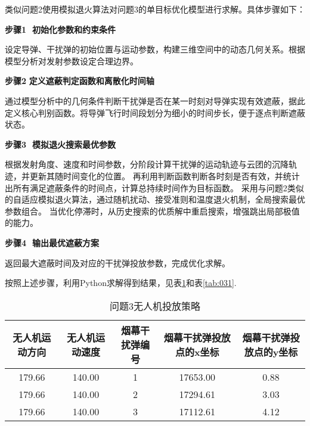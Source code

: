 \documentclass[../main.tex]{subfiles}
\begin{document}

类似问题2使用模拟退火算法对问题3的单目标优化模型进行求解。具体步骤如下：

\noindent\textbf{步骤1 $\,\,$初始化参数和约束条件} 

设定导弹、干扰弹的初始位置与运动参数，构建三维空间中的动态几何关系。根据模型分析对发射参数设定合理边界。

\noindent\textbf{步骤2$\,\,$定义遮蔽判定函数和离散化时间轴}

通过模型分析中的几何条件判断干扰弹是否在某一时刻对导弹实现有效遮蔽，据此定义核心判别函数。将导弹飞行时间段划分为细小的时间步长，便于逐点判断遮蔽状态。

\noindent\textbf{步骤3 $\,\,$模拟退火搜索最优参数} 

根据发射角度、速度和时间参数，分阶段计算干扰弹的运动轨迹与云团的沉降轨迹，并更新其随时间变化的位置。
再利用判断函数判断各时刻是否有效，并统计出所有满足遮蔽条件的时间点，计算总持续时间作为目标函数。
采用与问题2类似的自适应模拟退火算法，通过随机扰动、接受准则和温度退火机制，全局搜索最优参数组合。
当优化停滞时，从历史搜索的优质解中重启搜索，增强跳出局部极值的能力。

\noindent\textbf{步骤4 $\,\,$输出最优遮蔽方案} 

返回最大遮蔽时间及对应的干扰弹投放参数，完成优化求解。

按照上述步骤，利用Python求解得到结果，见表\ref{tab:001}和表\ref{tab:031}.
\begin{table}[H]
\caption{问题3无人机投放策略}
\label{tab:001} 
\centering
\begin{small}
\begin{tabular}{ccccc}
\toprule[1.5pt]
无人机运动方向 & 无人机运动速度 & 烟幕干扰弹编号 & 烟幕干扰弹投放点的x坐标& 烟幕干扰弹投放点的y坐标 \\
\midrule[1pt]
  179.66           &140.00                  & 1     & 17653.00                   & 0.88     \\            
  179.66           &140.00                  & 2     & 17294.61                   & 3.03      \\           
  179.66          &140.00                  & 3     & 17112.61                   & 4.12      \\           
\bottomrule[1.5pt]
\end{tabular}
\end{small}
\end{table}
\end{document}
